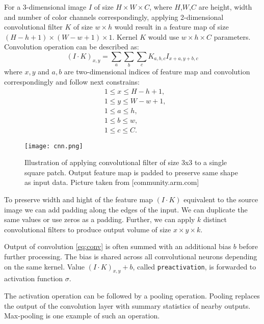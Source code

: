 For a 3-dimensional image $I$ of size $H \times W \times C$, where $H$,$W$,$C$ are height, width and number of color channels correspondingly, applying 2-dimensional convolutional filter $K$ of size $w \times h$ would result in a feature map of size $(H-h+1) \times (W-w+1) \times 1$. Kernel $K$ would use $w \times h \times C$ parameters. Convolution operation can be described as:
\begin{equation}\label{eq:conv}
  (I \cdot K)_{x, y} = \sum_a \sum_b \sum_c K_{a,b,c} I_{x+a, y+b,c}
\end{equation}
where ${x, y}$ and ${a,b}$ are two-dimensional indices of feature map and convolution correspondingly and follow next constrains:
\begin{equation*}
  \begin{aligned}
  &1 \leq  x \leq H-h+1, \\
  &1 \leq  y \leq W-w+1, \\
  &1 \leq  a \leq h, \\
  &1 \leq  b \leq w, \\
  &1 \leq  c \leq C.
\end{aligned}
\end{equation*}

\begin{figure}
  \texttt{[image: cnn.png]}
  \caption{Illustration of applying convolutional filter of size 3x3 to a single square patch. Output feature map is padded to preserve same shape as input data. Picture taken from [community.arm.com]}
  \label{fig:cnn}
\end{figure}

To preserve width and hight of the feature map $(I \cdot K)$ equivalent to the source image we can add padding along the edges of the input. We can duplicate the same values or use zeros as a padding.
Further, we can apply $k$ distinct convolutional filters to produce output volume of size $x \times y \times k$.

Output of convolution \ref{eq:conv} is often summed with an additional bias $b$ before further processing.
The bias is shared across all convolutional neurons depending on the same kernel.
Value $(I \cdot K)_{x, y}+b$, called \texttt{preactivation}, is forwarded to activation function $\sigma$.

The activation operation can be followed by a pooling operation.
Pooling replaces the output of the convolution layer with summary statistics of nearby outputs.
Max-pooling is one example of such an operation.

